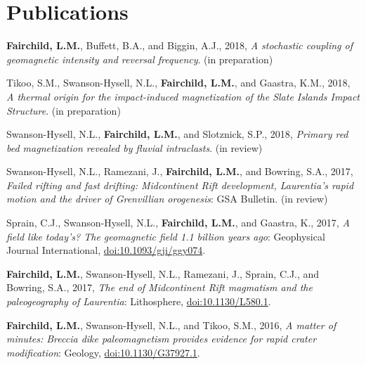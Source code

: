 \documentclass[10pt,a4paper,sans]{moderncv}
\begin{document}
\section{Publications}
\begin{etaremune}[itemsep=3pt]

    \item \textbf{Fairchild, L.M.}, Buffett, B.A., and Biggin, A.J., 2018,
        \textit{A stochastic coupling of geomagnetic intensity and reversal
        frequency}. (in preparation)

    \item{Tikoo, S.M., Swanson-Hysell, N.L., \textbf{Fairchild, L.M.}, and
            Gaastra, K.M., 2018, \textit{A thermal origin for the impact-induced
            magnetization of the Slate Islands Impact Structure}. (in preparation)}

    \item{Swanson-Hysell, N.L., \textbf{Fairchild, L.M.}, and Slotznick, S.P.,
            2018, \textit{Primary red bed magnetization revealed by fluvial
        intraclasts}. (in review)}

    \item{Swanson-Hysell, N.L., Ramezani, J., \textbf{Fairchild, L.M.}, and
            Bowring, S.A., 2017, \textit{Failed rifting and fast drifting:
                Midcontinent Rift development, Laurentia's rapid motion and the
        driver of Grenvillian orogenesis}: GSA Bulletin. (in review)}

    \item{Sprain, C.J., Swanson-Hysell, N.L., \textbf{Fairchild, L.M.}, and
            Gaastra, K., 2017, \textit{A field like today's? The geomagnetic
            field 1.1 billion years ago}: Geophysical Journal International,
            {\color{cyan}\href{https://doi.org/10.1093/gji/ggy074}
        {doi:10.1093/gji/ggy074}}.}

    \item{\textbf{Fairchild, L.M.}, Swanson-Hysell, N.L., Ramezani, J., Sprain,
            C.J., and Bowring, S.A., 2017, \textit{The end of Midcontinent Rift
            magmatism and the paleogeography of Laurentia}: Lithosphere,
            {\color{cyan}\href{https://doi.org/10.1130/L580.1}
        {doi:10.1130/L580.1}}.}

    \item{\textbf{Fairchild, L.M.}, Swanson-Hysell, N.L., and Tikoo, S.M., 2016,
            \textit{A matter of minutes: Breccia dike paleomagnetism provides
            evidence for rapid crater modification}: Geology,
            {\color{cyan}\href{https://doi.org/10.1130/G37927.1}
        {doi:10.1130/G37927.1}}.}


\end{etaremune}
\end{document}
